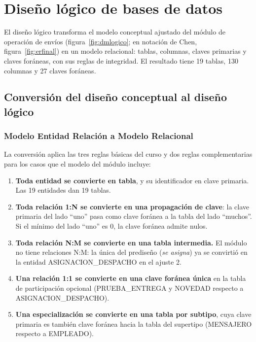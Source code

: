 
\section{Diseño lógico de bases de datos}

El diseño lógico transforma el modelo conceptual ajustado del módulo de
operación de envíos (figura~\ref{fig:dmlogico}; en notación de Chen,
figura~\ref{fig:erfinal}) en un modelo relacional:
tablas, columnas, claves primarias y claves foráneas, con sus reglas de
integridad. El resultado tiene 19 tablas, 130 columnas y 27 claves
foráneas.

\subsection{Conversión del diseño conceptual al diseño lógico}

\subsubsection{Modelo Entidad Relación a Modelo Relacional}

La conversión aplica las tres reglas básicas del curso y dos reglas
complementarias para los casos que el modelo del módulo incluye:

\begin{enumerate}[label=\textbf{R\arabic*.},leftmargin=1.2cm,itemsep=2pt]
  \item \textbf{Toda entidad se convierte en tabla}, y su identificador
        en clave primaria. Las 19 entidades dan 19 tablas.
  \item \textbf{Toda relación 1:N se convierte en una propagación de
        clave}: la clave primaria del lado ``uno'' pasa como clave
        foránea a la tabla del lado ``muchos''. Si el mínimo del lado
        ``uno'' es 0, la clave foránea admite nulos.
  \item \textbf{Toda relación N:M se convierte en una tabla intermedia.}
        El módulo no tiene relaciones N:M: la única del prediseño
        (\textit{se asigna}) ya se convirtió en la entidad
        ASIGNACION\_DESPACHO en el ajuste 2.
  \item \textbf{Una relación 1:1 se convierte en una clave foránea única}
        en la tabla de participación opcional (PRUEBA\_ENTREGA y
        NOVEDAD respecto a ASIGNACION\_DESPACHO).
  \item \textbf{Una especialización se convierte en una tabla por
        subtipo}, cuya clave primaria es también clave foránea hacia la
        tabla del supertipo (MENSAJERO respecto a EMPLEADO).
\end{enumerate}

